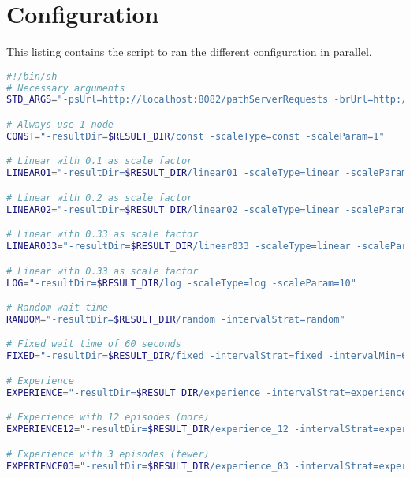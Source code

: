 \documentclass[thesis.tex]{subfiles}
\begin{document}
\section{Configuration} \label{app:config}
This listing contains the script to ran the different configuration in parallel.
\begin{lstlisting}[language=bash, basicstyle=\scriptsize]
#!/bin/sh
# Necessary arguments
STD_ARGS="-psUrl=http://localhost:8082/pathServerRequests -brUrl=http://localhost:8082/prometheusClient"

# Always use 1 node
CONST="-resultDir=$RESULT_DIR/const -scaleType=const -scaleParam=1"

# Linear with 0.1 as scale factor
LINEAR01="-resultDir=$RESULT_DIR/linear01 -scaleType=linear -scaleParam=0.1"

# Linear with 0.2 as scale factor
LINEAR02="-resultDir=$RESULT_DIR/linear02 -scaleType=linear -scaleParam=0.2"

# Linear with 0.33 as scale factor
LINEAR033="-resultDir=$RESULT_DIR/linear033 -scaleType=linear -scaleParam=0.33"

# Linear with 0.33 as scale factor
LOG="-resultDir=$RESULT_DIR/log -scaleType=log -scaleParam=10"

# Random wait time
RANDOM="-resultDir=$RESULT_DIR/random -intervalStrat=random"

# Fixed wait time of 60 seconds
FIXED="-resultDir=$RESULT_DIR/fixed -intervalStrat=fixed -intervalMin=60"

# Experience
EXPERIENCE="-resultDir=$RESULT_DIR/experience -intervalStrat=experience"

# Experience with 12 episodes (more)
EXPERIENCE12="-resultDir=$RESULT_DIR/experience_12 -intervalStrat=experience -cEpisodes=12"

# Experience with 3 episodes (fewer)
EXPERIENCE03="-resultDir=$RESULT_DIR/experience_03 -intervalStrat=experience -cEpisodes=3"
\end{lstlisting}
\end{document}

